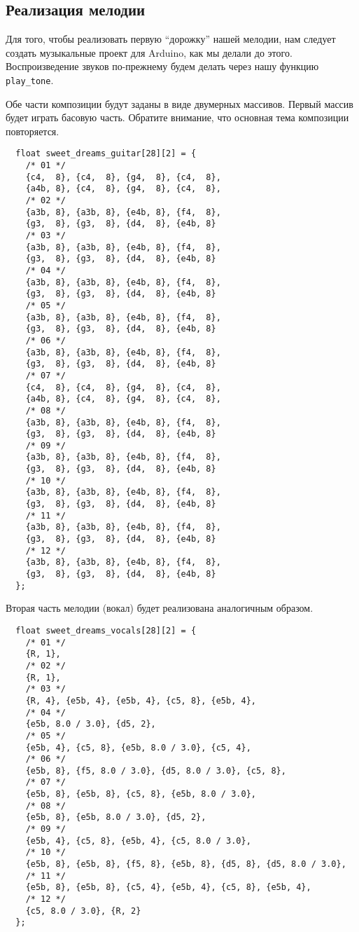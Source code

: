 \documentclass[../sparc.tex]{subfiles}
\begin{document}
\subsection{Реализация мелодии}

Для того, чтобы реализовать первую ``дорожку'' нашей мелодии, нам следует
создать музыкальные проект для Arduino, как мы делали до этого.  Воспроизведение
звуков по-прежнему будем делать через нашу функцию \texttt{play\_tone}.

Обе части композиции будут заданы в виде двумерных массивов.  Первый массив
будет играть басовую часть.  Обратите внимание, что основная тема композиции
повторяется.

\begin{verbatim}
  float sweet_dreams_guitar[28][2] = {
    /* 01 */
    {c4,  8}, {c4,  8}, {g4,  8}, {с4,  8},
    {a4b, 8}, {c4,  8}, {g4,  8}, {с4,  8},
    /* 02 */
    {a3b, 8}, {a3b, 8}, {e4b, 8}, {f4,  8},
    {g3,  8}, {g3,  8}, {d4,  8}, {e4b, 8}
    /* 03 */
    {a3b, 8}, {a3b, 8}, {e4b, 8}, {f4,  8},
    {g3,  8}, {g3,  8}, {d4,  8}, {e4b, 8}
    /* 04 */
    {a3b, 8}, {a3b, 8}, {e4b, 8}, {f4,  8},
    {g3,  8}, {g3,  8}, {d4,  8}, {e4b, 8}
    /* 05 */
    {a3b, 8}, {a3b, 8}, {e4b, 8}, {f4,  8},
    {g3,  8}, {g3,  8}, {d4,  8}, {e4b, 8}
    /* 06 */
    {a3b, 8}, {a3b, 8}, {e4b, 8}, {f4,  8},
    {g3,  8}, {g3,  8}, {d4,  8}, {e4b, 8}
    /* 07 */
    {c4,  8}, {c4,  8}, {g4,  8}, {с4,  8},
    {a4b, 8}, {c4,  8}, {g4,  8}, {с4,  8},
    /* 08 */
    {a3b, 8}, {a3b, 8}, {e4b, 8}, {f4,  8},
    {g3,  8}, {g3,  8}, {d4,  8}, {e4b, 8}
    /* 09 */
    {a3b, 8}, {a3b, 8}, {e4b, 8}, {f4,  8},
    {g3,  8}, {g3,  8}, {d4,  8}, {e4b, 8}
    /* 10 */
    {a3b, 8}, {a3b, 8}, {e4b, 8}, {f4,  8},
    {g3,  8}, {g3,  8}, {d4,  8}, {e4b, 8}
    /* 11 */
    {a3b, 8}, {a3b, 8}, {e4b, 8}, {f4,  8},
    {g3,  8}, {g3,  8}, {d4,  8}, {e4b, 8}
    /* 12 */
    {a3b, 8}, {a3b, 8}, {e4b, 8}, {f4,  8},
    {g3,  8}, {g3,  8}, {d4,  8}, {e4b, 8}
  };
\end{verbatim}

Вторая часть мелодии (вокал) будет реализована аналогичным образом.

\begin{verbatim}
  float sweet_dreams_vocals[28][2] = {
    /* 01 */
    {R, 1},
    /* 02 */
    {R, 1},
    /* 03 */
    {R, 4}, {e5b, 4}, {e5b, 4}, {c5, 8}, {e5b, 4},
    /* 04 */
    {e5b, 8.0 / 3.0}, {d5, 2},
    /* 05 */
    {e5b, 4}, {c5, 8}, {e5b, 8.0 / 3.0}, {c5, 4},
    /* 06 */
    {e5b, 8}, {f5, 8.0 / 3.0}, {d5, 8.0 / 3.0}, {c5, 8},
    /* 07 */
    {e5b, 8}, {e5b, 8}, {c5, 8}, {e5b, 8.0 / 3.0},
    /* 08 */
    {e5b, 8}, {e5b, 8.0 / 3.0}, {d5, 2},
    /* 09 */
    {e5b, 4}, {c5, 8}, {e5b, 4}, {c5, 8.0 / 3.0},
    /* 10 */
    {e5b, 8}, {e5b, 8}, {f5, 8}, {e5b, 8}, {d5, 8}, {d5, 8.0 / 3.0},
    /* 11 */
    {e5b, 8}, {e5b, 8}, {c5, 4}, {e5b, 4}, {c5, 8}, {e5b, 4},
    /* 12 */
    {c5, 8.0 / 3.0}, {R, 2}
  };
\end{verbatim}
\end{document}
